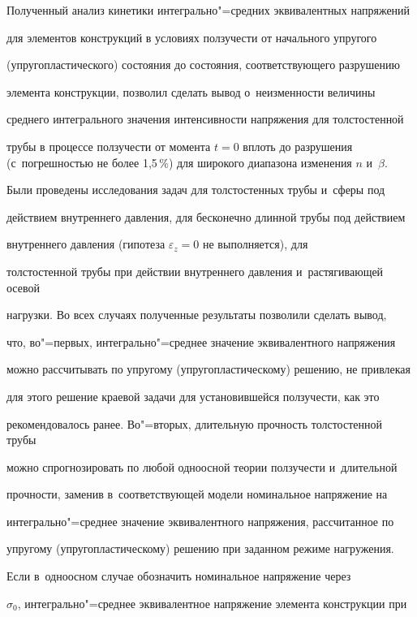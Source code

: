 \vspace{-2mm}



Полученный анализ кинетики интегрально"=средних эквивалентных напряжений 

для элементов конструкций в условиях ползучести от начального упругого 

(упругопластического) состояния до состояния, соответствующего разрушению 

элемента конструкции, позволил сделать вывод о~неизменности величины 

среднего интегрального значения интенсивности напряжения для толстостенной 

трубы в процессе ползучести от момента $t=0$ вплоть до разрушения (с~погрешностью не более 1{,}5\,{\%}) для широкого диапазона изменения $n$ и~$\beta $.



Были проведены исследования задач для толстостенных трубы и~сферы под 

действием внутреннего давления, для бесконечно длинной трубы под действием 

внутреннего давления (гипотеза $\varepsilon _z = 0$ не выполняется), для 

толстостенной трубы при действии внутреннего давления и~растягивающей осевой 

нагрузки. Во всех случаях полученные результаты позволили сделать вывод, 

что, во"=первых, интегрально"=среднее значение эквивалентного напряжения 

можно рассчитывать по упругому (упругопластическому) решению, не привлекая 

для этого решение краевой задачи для установившейся ползучести, как это 

рекомендовалось ранее. Во"=вторых, длительную прочность толстостенной трубы 

можно спрогнозировать по любой одноосной теории ползучести и~длительной 

прочности, заменив в~соответствующей модели номинальное напряжение на 

интегрально"=среднее значение эквивалентного напряжения, рассчитанное по 

упругому (упругопластическому) решению при заданном режиме нагружения.



Если в~одноосном случае обозначить номинальное напряжение через 

$\sigma _0 $, интегрально"=среднее эквивалентное напряжение элемента конструкции при 

